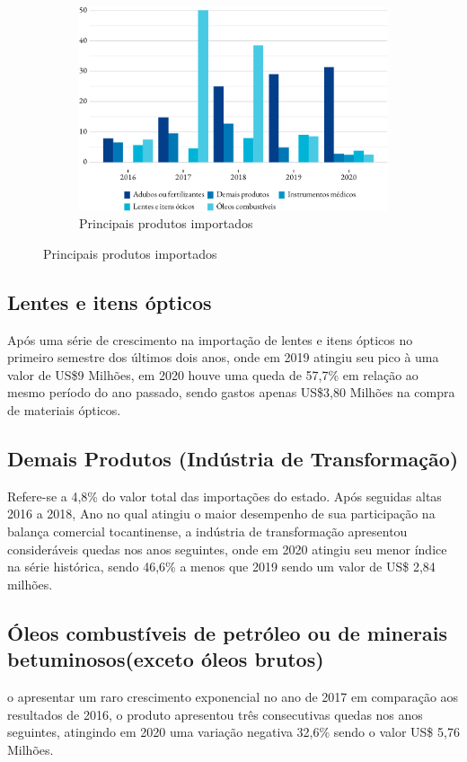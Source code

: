 \begin{figure}[!h]
	\begin{subfigure}{\linewidth}
		\caption{Principais produtos importados}
		\includegraphics{fig/produtos_import-1.pdf}
	\end{subfigure}
\end{figure}

\subsection{Lentes e itens ópticos}
\par Após uma série de crescimento na importação de lentes e itens ópticos no primeiro semestre dos últimos dois anos, onde em 2019 atingiu seu pico à uma valor de US\$9 Milhões, em 2020 houve uma queda de 57,7\% em relação ao mesmo período do ano passado, sendo gastos apenas US\$3,80 Milhões na compra de materiais ópticos. 

\subsection{Demais Produtos (Indústria de Transformação)}
\par Refere-se a 4,8\% do valor total das importações do estado. Após seguidas altas 2016 a 2018, Ano no qual atingiu o maior desempenho de sua participação na balança comercial tocantinense, a indústria de transformação apresentou consideráveis quedas nos anos seguintes, onde em 2020 atingiu seu menor índice na série histórica, sendo 46,6\% a menos que 2019 sendo um valor de US\$ 2,84 milhões. 

\subsection{Óleos combustíveis de petróleo ou de minerais betuminosos(exceto óleos brutos)}
\par o apresentar um raro crescimento exponencial no ano de 2017 em comparação aos resultados de 2016, o produto apresentou três consecutivas quedas nos anos seguintes, atingindo em 2020 uma variação negativa 32,6\% sendo o valor US\$ 5,76 Milhões.

